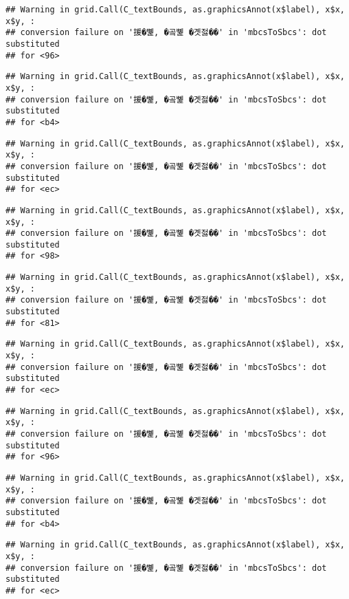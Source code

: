\documentclass[
]{article}
\begin{document}
\begin{verbatim}
## Warning in grid.Call(C_textBounds, as.graphicsAnnot(x$label), x$x, x$y, :
## conversion failure on '援�뼱, �곸뼱 �곗젏��' in 'mbcsToSbcs': dot substituted
## for <96>
\end{verbatim}

\begin{verbatim}
## Warning in grid.Call(C_textBounds, as.graphicsAnnot(x$label), x$x, x$y, :
## conversion failure on '援�뼱, �곸뼱 �곗젏��' in 'mbcsToSbcs': dot substituted
## for <b4>
\end{verbatim}

\begin{verbatim}
## Warning in grid.Call(C_textBounds, as.graphicsAnnot(x$label), x$x, x$y, :
## conversion failure on '援�뼱, �곸뼱 �곗젏��' in 'mbcsToSbcs': dot substituted
## for <ec>
\end{verbatim}

\begin{verbatim}
## Warning in grid.Call(C_textBounds, as.graphicsAnnot(x$label), x$x, x$y, :
## conversion failure on '援�뼱, �곸뼱 �곗젏��' in 'mbcsToSbcs': dot substituted
## for <98>
\end{verbatim}

\begin{verbatim}
## Warning in grid.Call(C_textBounds, as.graphicsAnnot(x$label), x$x, x$y, :
## conversion failure on '援�뼱, �곸뼱 �곗젏��' in 'mbcsToSbcs': dot substituted
## for <81>
\end{verbatim}

\begin{verbatim}
## Warning in grid.Call(C_textBounds, as.graphicsAnnot(x$label), x$x, x$y, :
## conversion failure on '援�뼱, �곸뼱 �곗젏��' in 'mbcsToSbcs': dot substituted
## for <ec>
\end{verbatim}

\begin{verbatim}
## Warning in grid.Call(C_textBounds, as.graphicsAnnot(x$label), x$x, x$y, :
## conversion failure on '援�뼱, �곸뼱 �곗젏��' in 'mbcsToSbcs': dot substituted
## for <96>
\end{verbatim}

\begin{verbatim}
## Warning in grid.Call(C_textBounds, as.graphicsAnnot(x$label), x$x, x$y, :
## conversion failure on '援�뼱, �곸뼱 �곗젏��' in 'mbcsToSbcs': dot substituted
## for <b4>
\end{verbatim}

\begin{verbatim}
## Warning in grid.Call(C_textBounds, as.graphicsAnnot(x$label), x$x, x$y, :
## conversion failure on '援�뼱, �곸뼱 �곗젏��' in 'mbcsToSbcs': dot substituted
## for <ec>
\end{verbatim}
\end{document}
